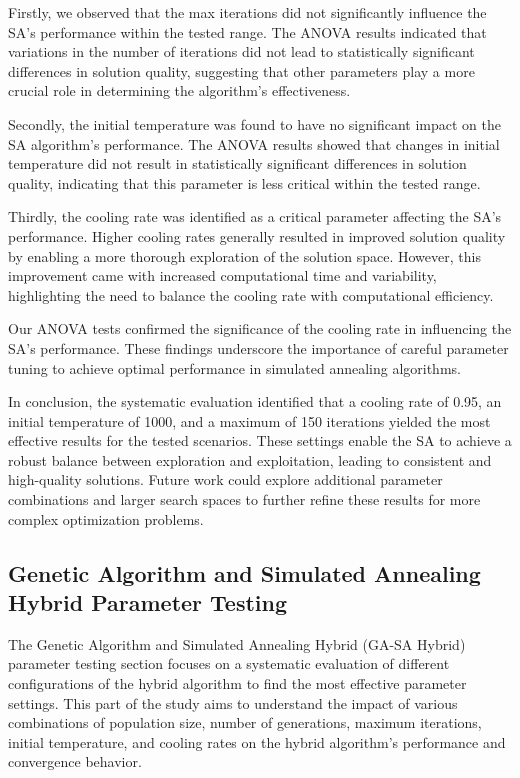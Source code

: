\documentclass[
]{article}
\begin{document}
    Firstly, we observed that the max iterations did not significantly influence the SA's performance within the tested range. The ANOVA results indicated that variations in the number of iterations did not lead to statistically significant differences in solution quality, suggesting that other parameters play a more crucial role in determining the algorithm's effectiveness.

    Secondly, the initial temperature was found to have no significant impact on the SA algorithm's performance. The ANOVA results showed that changes in initial temperature did not result in statistically significant differences in solution quality, indicating that this parameter is less critical within the tested range.

    Thirdly, the cooling rate was identified as a critical parameter affecting the SA’s performance. Higher cooling rates generally resulted in improved solution quality by enabling a more thorough exploration of the solution space. However, this improvement came with increased computational time and variability, highlighting the need to balance the cooling rate with computational efficiency.

    Our ANOVA tests confirmed the significance of the cooling rate in influencing the SA’s performance. These findings underscore the importance of careful parameter tuning to achieve optimal performance in simulated annealing algorithms.

    In conclusion, the systematic evaluation identified that a cooling rate of 0.95, an initial temperature of 1000, and a maximum of 150 iterations yielded the most effective results for the tested scenarios. These settings enable the SA to achieve a robust balance between exploration and exploitation, leading to consistent and high-quality solutions. Future work could explore additional parameter combinations and larger search spaces to further refine these results for more complex optimization problems.

    \newpage

    \subsection{Genetic Algorithm and Simulated Annealing Hybrid Parameter Testing}\label{subsec:genetic-algorithm-and-simulated-annealing-hybrid-parameter-testing}

    The Genetic Algorithm and Simulated Annealing Hybrid (GA-SA Hybrid) parameter testing section focuses on a systematic evaluation of different configurations of the hybrid algorithm to find the most effective parameter settings. This part of the study aims to understand the impact of various combinations of population size, number of generations, maximum iterations, initial temperature, and cooling rates on the hybrid algorithm's performance and convergence behavior.
\end{document}
